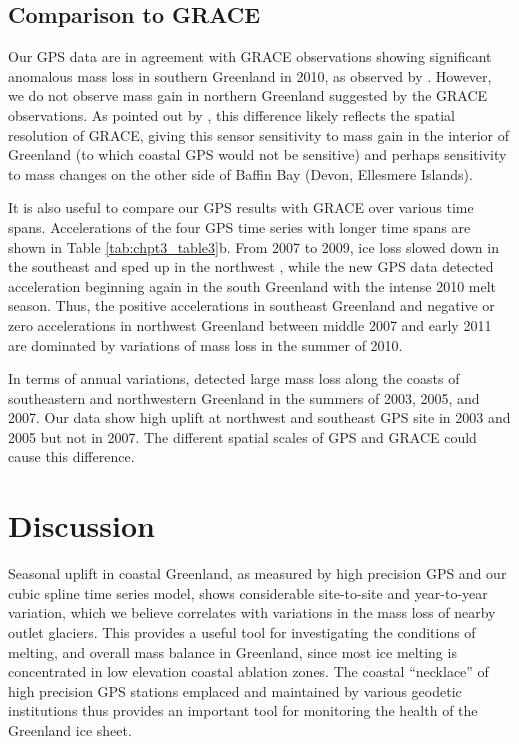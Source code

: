 \subsection{Comparison to GRACE}
Our GPS data are in agreement with GRACE
observations showing significant anomalous mass
loss in southern Greenland in 2010, as observed
by \cite{bevis2012bedrock}. However, we do not observe
mass gain in northern Greenland suggested by the
GRACE observations. As pointed out by \cite{bevis2012bedrock}, this difference likely reflects the spatial
resolution of GRACE, giving this sensor sensitivity
to mass gain in the interior of Greenland (to which
coastal GPS would not be sensitive) and perhaps
sensitivity to mass changes on the other side of
Baffin Bay (Devon, Ellesmere Islands).

It is also useful to compare our GPS results with
GRACE over various time spans. Accelerations of
the four GPS time series with longer time spans are
shown in Table \ref{tab:chpt3_table3}b. From 2007 to 2009, ice loss
slowed down in the southeast and sped up in the
northwest \cite[]{schrama2011revisiting,chen2011interannual,khan2010spread}, while the new GPS
data detected acceleration beginning again in the
south Greenland with the intense 2010 melt season.
Thus, the positive accelerations in southeast
Greenland and negative or zero accelerations in
northwest Greenland between middle 2007 and
early 2011 are dominated by variations of mass
loss in the summer of 2010.

In terms of annual variations, \cite{wouters2008grace} detected large mass loss along the coasts of
southeastern and northwestern Greenland in the summers
of 2003, 2005, and 2007. Our data show high
uplift at northwest and southeast GPS site in 2003
and 2005 but not in 2007. The different spatial scales
of GPS and GRACE could cause this difference.

\section{Discussion}
Seasonal uplift in coastal Greenland, as measured
by high precision GPS and our cubic spline time
series model, shows considerable site-to-site and
year-to-year variation, which we believe correlates
with variations in the mass loss of nearby outlet
glaciers. This provides a useful tool for investigating
the conditions of melting, and overall mass
balance in Greenland, since most ice melting is
concentrated in low elevation coastal ablation
zones. The coastal “necklace” of high precision
GPS stations emplaced and maintained by various
geodetic institutions \cite[]{bevis2012bedrock} thus provides
an important tool for monitoring the health
of the Greenland ice sheet.

